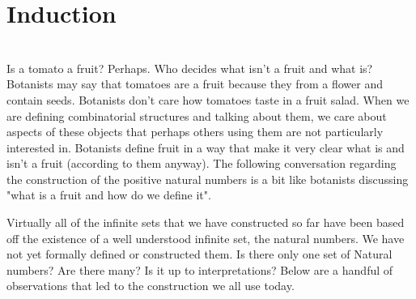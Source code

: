 \section{Induction} $ $\\

Is a tomato a fruit? Perhaps.
\newline
Who decides what isn't a fruit and what is? Botanists may say that tomatoes are a fruit because they from a flower and contain seeds. Botanists don't care how tomatoes taste in a fruit salad. 
\newline
When we are defining combinatorial structures and talking about them, we care about aspects of these objects that perhaps others using them are not particularly interested in. Botanists define fruit in a way that make it very clear what is and isn't a fruit (according to them anyway).
\newline
The following conversation regarding the construction of the positive natural numbers is a bit like botanists discussing "what is a fruit and how do we define it".
\newline

Virtually all of the infinite sets that we have constructed so far have been based off the existence of a well understood infinite set, the natural numbers. We have not yet formally defined or constructed them. Is there only one set of Natural numbers? Are there many? Is it up to interpretations? Below are a handful of observations that led to the construction we all use today.
\newline

